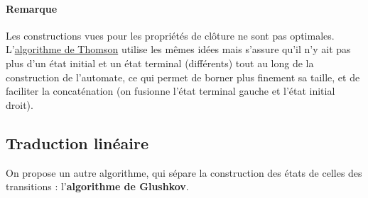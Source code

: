 \paragraph*{Remarque} Les constructions vues pour les propriétés de clôture ne sont pas optimales. L'\href{https://fr.wikipedia.org/wiki/Algorithme_de_Thompson}{algorithme de Thomson} utilise les mêmes idées mais s'assure qu'il n'y ait pas plus d'un état initial et un état terminal (différents) tout au long de la construction de l'automate, ce qui permet de borner plus finement sa taille, et de faciliter la concaténation (on fusionne l'état terminal gauche et l'état initial droit).

\subsection{Traduction linéaire}
\label{glushkov}
On propose un autre algorithme, qui sépare la construction des états de celles des transitions : l'\textbf{algorithme de Glushkov}.

